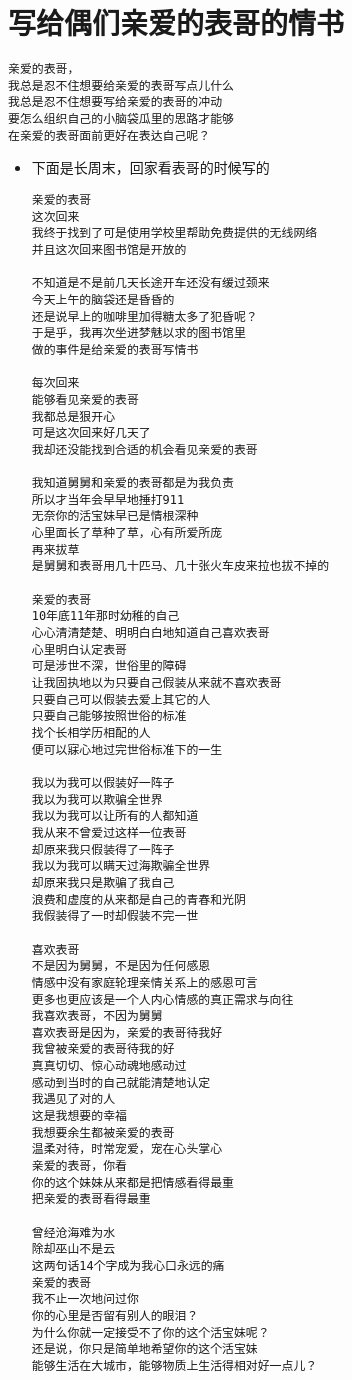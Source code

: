 \documentclass[9pt, b5paaper]{book}
\begin{document}
\chapter{写给偶们亲爱的表哥的情书}
\label{sec-3}
\begin{verbatim}
亲爱的表哥，
我总是忍不住想要给亲爱的表哥写点儿什么
我总是忍不住想要写给亲爱的表哥的冲动
要怎么组织自己的小脑袋瓜里的思路才能够
在亲爱的表哥面前更好在表达自己呢？
\end{verbatim}

\begin{itemize}
\item 下面是长周末，回家看表哥的时候写的
\begin{verbatim}
亲爱的表哥
这次回来
我终于找到了可是使用学校里帮助免费提供的无线网络
并且这次回来图书馆是开放的

不知道是不是前几天长途开车还没有缓过颈来
今天上午的脑袋还是昏昏的
还是说早上的咖啡里加得糖太多了犯昏呢？
于是乎，我再次坐进梦魅以求的图书馆里
做的事件是给亲爱的表哥写情书

每次回来
能够看见亲爱的表哥
我都总是狠开心
可是这次回来好几天了
我却还没能找到合适的机会看见亲爱的表哥

我知道舅舅和亲爱的表哥都是为我负责
所以才当年会早早地捶打911
无奈你的活宝妹早已是情根深种
心里面长了草种了草，心有所爱所庞
再来拔草
是舅舅和表哥用几十匹马、几十张火车皮来拉也拔不掉的

亲爱的表哥
10年底11年那时幼稚的自己
心心清清楚楚、明明白白地知道自己喜欢表哥
心里明白认定表哥
可是涉世不深，世俗里的障碍
让我固执地以为只要自己假装从来就不喜欢表哥
只要自己可以假装去爱上其它的人
只要自己能够按照世俗的标准
找个长相学历相配的人
便可以寐心地过完世俗标准下的一生

我以为我可以假装好一阵子
我以为我可以欺骗全世界
我以为我可以让所有的人都知道
我从来不曾爱过这样一位表哥
却原来我只假装得了一阵子
我以为我可以瞒天过海欺骗全世界
却原来我只是欺骗了我自己
浪费和虚度的从来都是自己的青春和光阴
我假装得了一时却假装不完一世

喜欢表哥
不是因为舅舅，不是因为任何感恩
情感中没有家庭轮理亲情关系上的感恩可言
更多也更应该是一个人内心情感的真正需求与向往
我喜欢表哥，不因为舅舅
喜欢表哥是因为，亲爱的表哥待我好
我曾被亲爱的表哥待我的好
真真切切、惊心动魂地感动过
感动到当时的自己就能清楚地认定
我遇见了对的人
这是我想要的幸福
我想要余生都被亲爱的表哥
温柔对待，时常宠爱，宠在心头掌心
亲爱的表哥，你看
你的这个妹妹从来都是把情感看得最重
把亲爱的表哥看得最重

曾经沧海难为水
除却巫山不是云
这两句话14个字成为我心口永远的痛
亲爱的表哥
我不止一次地问过你
你的心里是否留有别人的眼泪？
为什么你就一定接受不了你的这个活宝妹呢？
还是说，你只是简单地希望你的这个活宝妹
能够生活在大城市，能够物质上生活得相对好一点儿？


\end{verbatim}
\end{itemize}
\end{document}
